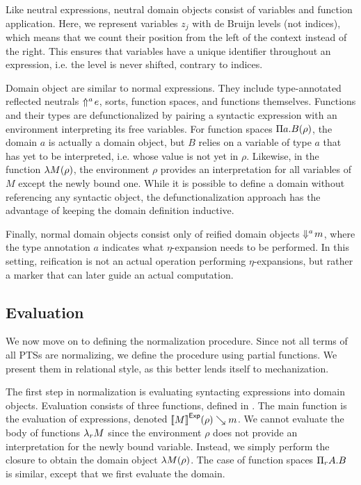 Like neutral expressions, neutral domain objects consist of variables and function application.
Here, we represent variables $z_j$ with de Bruijn levels (not indices), which means that we count their position from the left of the context instead of the right.
This ensures that variables have a unique identifier throughout an expression, i.e. the level is never shifted, contrary to indices.

Domain object are similar to normal expressions.
They include type-annotated reflected neutrals $\Uparrow^{a}\!e$, sorts, function spaces, and functions themselves.
Functions and their types are defunctionalized by pairing a syntactic expression with an environment interpreting its free variables.
For function spaces $\Pi a.B(\rho)$, the domain $a$ is actually a domain object, but $B$ relies on a variable of type $a$ that has yet to be interpreted, i.e. whose value is not yet in $\rho$.
Likewise, in the function $\lambda M(\rho)$, the environment $\rho$ provides an interpretation for all variables of $M$ except the newly bound one.
While it is possible to define a domain without referencing any syntactic object, the defunctionalization approach has the advantage of keeping the domain definition inductive.

Finally, normal domain objects consist only of reified domain objects $\Downarrow^{a}\!m$,
  where the type annotation $a$ indicates what $\eta$-expansion needs to be performed.
In this setting, reification is not an actual operation performing $\eta$-expansions, but rather a marker that can later guide an actual computation.





\subsection{Evaluation}

We now move on to defining the normalization procedure.
Since not all terms of all \acp{PTS} are normalizing, we define the procedure using partial functions.
We present them in relational style, as this better lends itself to mechanization.



The first step in normalization is evaluating syntacting expressions into domain objects.
Evaluation consists of three functions, defined in .
The main function is the evaluation of expressions, denoted ${[\![M]\!]}^{\mathsf{Exp}}(\rho) \searrow m$.
We cannot evaluate the body of functions $\tmlam M$ since the environment $\rho$ does not provide an interpretation for the newly bound variable.
Instead, we simply perform the closure to obtain the domain object $\lambda M(\rho)$.
The case of function spaces $\tppi A B$ is similar, except that we first evaluate the domain.


